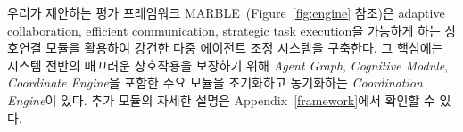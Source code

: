 

우리가 제안하는 평가 프레임워크 MARBLE~(Figure~\ref{fig:engine} 참조)은 adaptive collaboration, efficient communication, strategic task execution을 가능하게 하는 상호연결 모듈을 활용하여 강건한 다중 에이전트 조정 시스템을 구축한다. 그 핵심에는 시스템 전반의 매끄러운 상호작용을 보장하기 위해 \textit{Agent Graph}, \textit{Cognitive Module}, \textit{Coordinate Engine}을 포함한 주요 모듈을 초기화하고 동기화하는 \textit{Coordination Engine}이 있다. 추가 모듈의 자세한 설명은 Appendix~\ref{framework}에서 확인할 수 있다.


